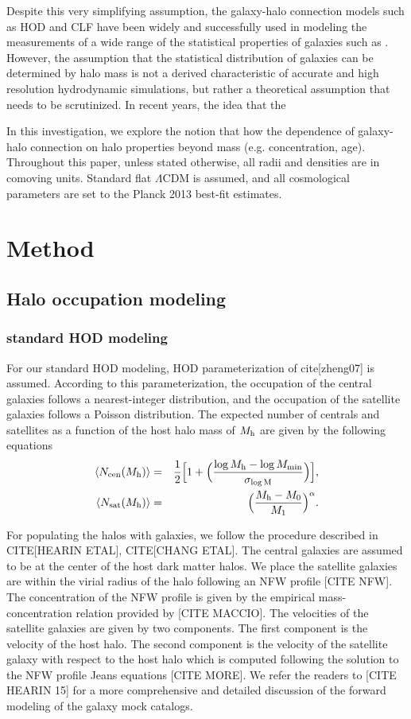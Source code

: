 \documentclass[14pt, preprint]{emulateapj}
\begin{document}
Despite this very simplifying assumption, the galaxy-halo connection models such as HOD and CLF have been widely and successfully used in modeling the measurements of a wide range of the statistical properties of galaxies such as . However, the assumption that the statistical 
distribution of galaxies can be determined by halo mass is not a derived characteristic of 
accurate and high resolution hydrodynamic simulations, but rather a theoretical assumption 
that needs to be scrutinized. In recent years, the idea that the   

In this investigation, we explore the notion that how the dependence of 
galaxy-halo connection on halo properties beyond mass (e.g. concentration, age).
Throughout this paper, unless stated otherwise, 
all radii and densities are in comoving units. Standard flat $\Lambda$CDM is assumed, 
and all cosmological parameters are set to the Planck 2013 best-fit estimates.

\section{Method}
\subsection{Halo occupation modeling}
\subsubsection{standard HOD modeling}\label{subsubsec:hod}
For our standard HOD modeling, HOD parameterization of cite[zheng07] is assumed. According to this parameterization, the occupation of the central galaxies follows a nearest-integer distribution, 
and the occupation of the satellite galaxies follows a Poisson distribution. The expected number of centrals and satellites as a function of the host halo mass of $M_{\rm h}$ are given by the following equations 
\begin{eqnarray}
\langle N_{\rm cen}(M_{\rm h}) \rangle &=& \frac{1}{2}\Big[1+\Big(\frac{\log M_{\rm h} - \log M_{\rm min}}{\sigma_{\log \rm{M}}} \Big) \Big], \label{hod:central}\\ 
\langle N_{\rm sat}(M_{\rm h}) \rangle &=& \Big( \frac{M_{\rm h} - M_{\rm{0}}}{M_{\rm 1}} \Big)^{\alpha}. \label{hod:satellite}
\end{eqnarray}

For populating the halos with galaxies, we follow the procedure described in CITE[HEARIN ETAL], CITE[CHANG ETAL]. The central galaxies are assumed to be at the center of the host dark matter halos. We place the satellite galaxies are within the virial radius of the halo following an NFW profile [CITE NFW]. The concentration of the NFW profile is given by the empirical mass-concentration relation provided by [CITE MACCIO]. The velocities of the satellite galaxies are given by two components. The first component is the velocity of the host halo. The second component is the velocity of the satellite galaxy with respect to the host halo which is computed following the solution to the NFW profile Jeans equations [CITE MORE]. We refer the readers to [CITE HEARIN 15] for a more comprehensive and detailed discussion of the forward modeling of the galaxy mock catalogs.
\end{document}
